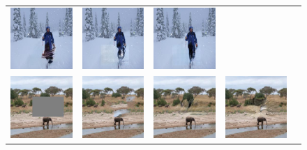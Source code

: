 \begin{figure}[!ht]
\begin{tabular}{ccccc}
\includegraphics[width=.2\textwidth]{figures/random/000000266409_sig.jpg}&
\includegraphics[width=.2\textwidth]{figures/random/000000266409_g.jpg}&
\includegraphics[width=.2\textwidth]{figures/random/000000266409.jpg}\\
\includegraphics[width=.2\textwidth]{figures/random/000000286994_ip.jpg}&
\includegraphics[width=.2\textwidth]{figures/random/000000286994_pm.jpg}&
\includegraphics[width=.2\textwidth]{figures/random/000000286994_sig.jpg}&
\includegraphics[width=.2\textwidth]{figures/random/000000286994_g.jpg}&

\end{tabular}
\end{figure}

